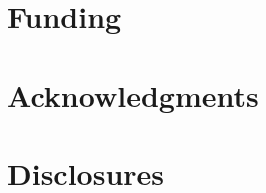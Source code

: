 \documentclass[10pt]{article}
\begin{document}
\section*{Funding}

\section*{Acknowledgments}

\section*{Disclosures}

{}

%
\end{document}
